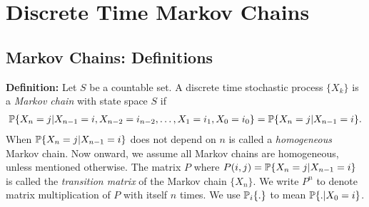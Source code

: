 \documentclass[all-lectures.tex]{subfiles}
\begin{document}

\chapter{Discrete Time Markov Chains}
\setcounter{section}{0}
\setcounter{subsection}{0}

\section*{}
\chr
\section{Markov Chains: Definitions}
\textbf{Definition:}
Let $S$ be a countable set. A discrete time stochastic process  $\{X_k\}$ is a \textit{Markov chain} with state space $S$ if 
\begin{align*}
\P\{X_n = j|X_{n-1} = i, X_{n-2} = i_{n-2},\dots,X_1 = i_1,X_0 = i_0\} = \P\{X_n = j|X_{n-1} = i\}.
\end{align*}
When $\P\{X_n = j|X_{n-1} = i\}$ does not depend on $n$ is called a \textit{homogeneous }Markov chain. Now onward, we assume all Markov chains are homogeneous, unless mentioned otherwise. The matrix $P$ where $P(i,j) = \P\{X_n = j|X_{n-1} = i\}$ is called the \textit{transition matrix }of the Markov chain $\{X_n\}$. We write $P^n$ to denote matrix multiplication of $P$ with itself $n$ times. We use $\P_i\{.\}$ to mean $\P\{.|X_0 = i\}$. \\
\end{document}

